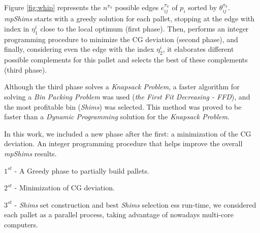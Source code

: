 \documentclass[preprint,authoryear]{elsarticle}
\begin{document}
\begin{table}[H]
\begin{minipage}{0.58\linewidth}
		\label{fig:whip}		
	\end{minipage}
\end{table}


Figure \ref{fig:whip} represents the $n^{\pi_k}$\/ possible edges $e_{ij}^{\pi_k}$\/ of $p_i$\/ sorted by $\theta_{ij}^{\pi_k}$. \emph{mpShims}\/ starts with a greedy solution for each pallet, stopping at the edge with index in $\eta_1^i$ close to the local optimum (first phase). Then, performs an integer programming procedure to minimize the CG deviation (second phase), and finally, considering even the edge with the index $\eta_2^i$, it elaborates different possible complements for this pallet and selects the best of these complements (third phase).

Although the third phase solves a {\it Knapsack Problem}, a faster algorithm for solving a {\it Bin Packing Problem} was used ({\it the First Fit Decreasing - FFD}), and the most profitable bin ({\it Shims}) was selected. This method was proved to be faster than a {\it Dynamic Programming} solution for the {\it Knapsack Problem}.
		
	In this work, we included a new phase after the first: a minimization of the CG deviation. An integer programming procedure that helps improve the overall {\it mpShims} results.

$1^{st}$ - A Greedy phase to partially build pallets.

$2^{st}$ - Minimization of CG deviation.

$3^{st}$ - {\it Shims} set construction and best {\it Shims} selection
ess run-time, we considered each pallet as a parallel process, taking advantage of nowadays multi-core computers.
\end{document}

